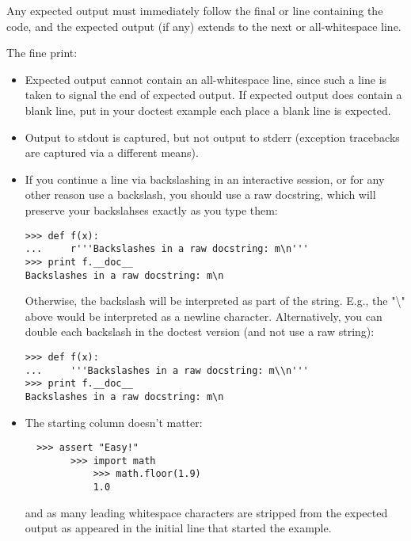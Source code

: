 Any expected output must immediately follow the final
 or  line containing the code, and
the expected output (if any) extends to the next 
or all-whitespace line.

The fine print:

\begin{itemize}

\item Expected output cannot contain an all-whitespace line, since such a
  line is taken to signal the end of expected output.  If expected
  output does contain a blank line, put  in your
  doctest example each place a blank line is expected.

\item Output to stdout is captured, but not output to stderr (exception
  tracebacks are captured via a different means).

\item If you continue a line via backslashing in an interactive session,
  or for any other reason use a backslash, you should use a raw
  docstring, which will preserve your backslahses exactly as you type
  them:

\begin{verbatim}
>>> def f(x):
...     r'''Backslashes in a raw docstring: m\n'''
>>> print f.__doc__
Backslashes in a raw docstring: m\n
\end{verbatim}

  Otherwise, the backslash will be interpreted as part of the string.
  E.g., the "\textbackslash" above would be interpreted as a newline
  character.  Alternatively, you can double each backslash in the
  doctest version (and not use a raw string):

\begin{verbatim}
>>> def f(x):
...     '''Backslashes in a raw docstring: m\\n'''
>>> print f.__doc__
Backslashes in a raw docstring: m\n
\end{verbatim}

\item The starting column doesn't matter:

\begin{verbatim}
  >>> assert "Easy!"
        >>> import math
            >>> math.floor(1.9)
            1.0
\end{verbatim}

and as many leading whitespace characters are stripped from the
expected output as appeared in the initial  line
that started the example.
\end{itemize}

